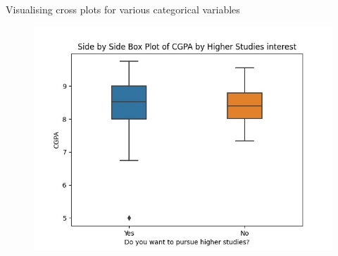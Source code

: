 \documentclass{beamer}
\begin{document}
\begin{frame}
  \begin{block}{Visualising cross plots for various categorical variables}
  \begin{figure}
  \centering
  \includegraphics[scale=0.45]{CGPA vs interest.jpg}
  \label{fig:8}
  \end{figure}
  \end{block}
\end{frame}
\end{document}
